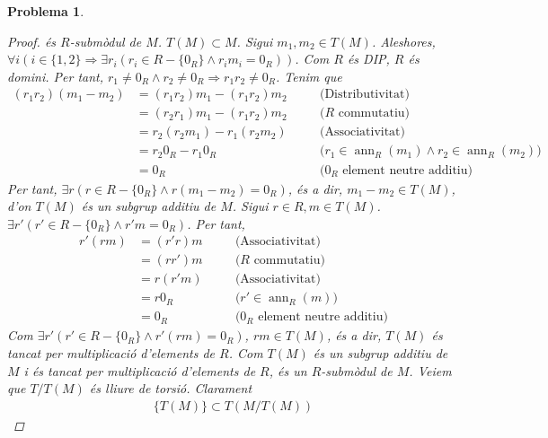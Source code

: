 \documentclass[compress]{article}
\newtheorem{problema}{Problema}
\theoremstyle{definition}
\DeclareMathOperator{\ann}{ann}
\begin{document}
\begin{problema}
\begin{enumerate}
\begin{proof}
            és $R$-submòdul de $M$. $T(M)\subset M$. Sigui $m_{1},m_{2}\in T(M)$. Aleshores, $\forall i(i\in\{1,2\}\Rightarrow\exists r_{i}(r_{i}\in R-\{0_{R}\}\land r_{i}m_{i}=0_{R}))$. Com $R$ és DIP, $R$ és domini. Per tant, $r_{1}\neq0_{R}\land r_{2}\neq0_{R}\Rightarrow r_{1}r_{2}\neq0_{R}$. Tenim que
            \begin{align*}
                (r_{1}r_{2})(m_{1}-m_{2})
                &=(r_{1}r_{2})m_{1}-(r_{1}r_{2})m_{2}
                &\quad&\textrm{(Distributivitat)}\\
                &=(r_{2}r_{1})m_{1}-(r_{1}r_{2})m_{2}
                &\quad&\textrm{($R$ commutatiu)}\\
                &=r_{2}(r_{2}m_{1})-r_{1}(r_{2}m_{2})
                &\quad&\textrm{(Associativitat)}\\
                &=r_{2}0_{R}-r_{1}0_{R}
                &\quad&\textrm{($r_{1}\in\ann_{R}(m_{1})\land r_{2}\in\ann_{R}(m_{2})$)}\\
                &=0_{R}
                &\quad&\textrm{($0_{R}$ element neutre additiu)}
            \end{align*}
            Per tant, $\exists r(r\in R-\{0_{R}\}\land r(m_{1}-m_{2})=0_{R})$, és a dir, $m_{1}-m_{2}\in T(M)$, d'on $T(M)$ és un subgrup additiu de $M$. Sigui $r\in R,m\in T(M)$. $\exists r'(r'\in R-\{0_{R}\}\land r'm=0_{R})$. Per tant,
            \begin{align*}
                r'(rm)
                &=(r'r)m
                &\quad&\textrm{(Associativitat)}\\
                &=(rr')m
                &\quad&\textrm{($R$ commutatiu)}\\
                &=r(r'm)
                &\quad&\textrm{(Associativitat)}\\
                &=r0_{R}
                &\quad&\textrm{($r'\in\ann_{R}(m)$)}\\
                &=0_{R}
                &\quad&\textrm{($0_{R}$ element neutre additiu)}
            \end{align*}
            Com $\exists r'(r'\in R-\{0_{R}\}\land r'(rm)=0_{R})$, $rm\in T(M)$, és a dir, $T(M)$ és tancat per multiplicació d'elements de $R$. Com $T(M)$ és un subgrup additiu de $M$ i és tancat per multiplicació d'elements de $R$, és un $R$-submòdul de $M$.\newline
            Veiem que $T/T(M)$ és lliure de torsió. Clarament
            \begin{align*}
                \{T(M)\}\subset T(M/T(M))

\end{align*}
\end{proof}
\end{enumerate}
\end{problema}
\end{document}
